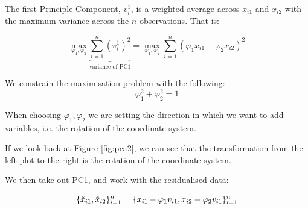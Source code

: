 \documentclass[11pt]{article}
\begin{document}
\begin{procedure}
    The first Principle Component, $v_i^1$, is a weighted average across $x_{i1}$ and $x_{i2}$ with the maximum variance across the $n$ observations. That is:

    \begin{equation}
        \underset{\varphi_1, \varphi_2}{\max}\underbrace{\sum_{i=1}^n (v_i^1)^2}_{\text{variance of PC1}} = \underset{\varphi_1, \varphi_2}{\max} \sum_{i=1}^n (\varphi_1 x_{i1} + \varphi_2 x_{i2})^2
    \end{equation}

    We constrain the maximisation problem with the following:
    \begin{equation*}
        \varphi_1^2 + \varphi_2^2 = 1
    \end{equation*}

    When choosing $\varphi_1, \varphi_2$ we are setting the direction in which we want to add variables, i.e. the rotation of the coordinate system.

    \begin{note}
        If we look back at Figure \ref{fig:pca2}, we can see that the transformation from the left plot to the right is the rotation of the coordinate system.
    \end{note}

    We then take out PC1, and work with the residualised data:

    \begin{equation*}
        \{\Tilde{x}_{i1}, \Tilde{x}_{i2}\}_{i=1}^n = \{x_{i1} - \varphi_1 v_{i1},x_{i2} - \varphi_2 v_{i1}\}_{i=1}^n
    \end{equation*}
    
\end{procedure}
\end{document}

